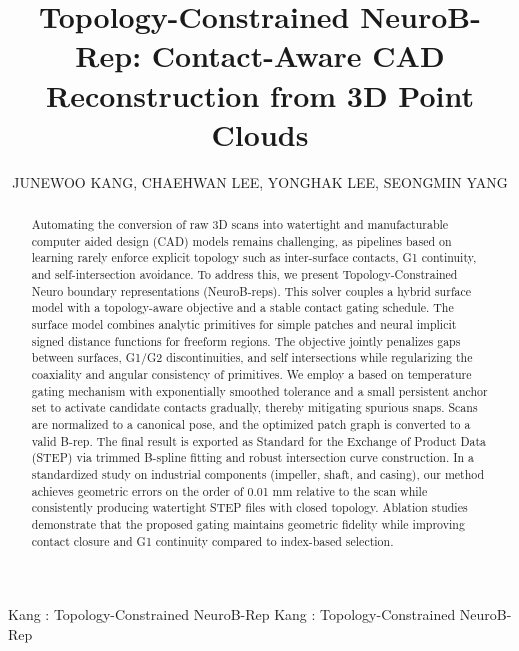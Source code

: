 \documentclass{ieeeaccess}
\begin{document}

\title{Topology-Constrained NeuroB-Rep: Contact-Aware CAD Reconstruction from 3D Point Clouds}

\author{
\uppercase{JuneWoo Kang},
\uppercase{ChaeHwan Lee},
\uppercase{YongHak Lee},
\uppercase{SeongMin Yang}
}

\address[1]{Department of Computer Information Engineering, Kwangwoon University, Seoul 01897, Korea}
\address[2]{Department of Data Science, Konkuk University, Seoul 05029, Korea}
\address[3]{Department of Applied Statistics, Konkuk University, Seoul 05029, Korea}


\markboth
{Kang \headeretal: Topology-Constrained NeuroB-Rep}
{Kang \headeretal: Topology-Constrained NeuroB-Rep}

    
\begin{abstract} 
Automating the conversion of raw 3D scans into watertight and manufacturable computer aided design (CAD) models remains challenging, as pipelines based on learning rarely enforce explicit topology such as inter-surface contacts, G1 continuity, and self-intersection avoidance. To address this, we present Topology-Constrained Neuro boundary representations (NeuroB-reps). This solver couples a hybrid surface model with a topology-aware objective and a stable contact gating schedule. The surface model combines analytic primitives for simple patches and neural implicit signed distance functions for freeform regions. The objective jointly penalizes gaps between surfaces, G1/G2 discontinuities, and self intersections while regularizing the coaxiality and angular consistency of primitives. We employ a based on temperature gating mechanism with exponentially smoothed tolerance and a small persistent anchor set to activate candidate contacts gradually, thereby mitigating spurious snaps. Scans are normalized to a canonical pose, and the optimized patch graph is converted to a valid B-rep. The final result is exported as Standard for the Exchange of Product Data (STEP) via trimmed B-spline fitting and robust intersection curve construction. In a standardized study on industrial components (impeller, shaft, and casing), our method achieves geometric errors on the order of 0.01 mm relative to the scan while consistently producing watertight STEP files with closed topology. Ablation studies demonstrate that the proposed gating maintains geometric fidelity while improving contact closure and G1 continuity compared to index-based selection.  
\end{abstract}
\end{document}
